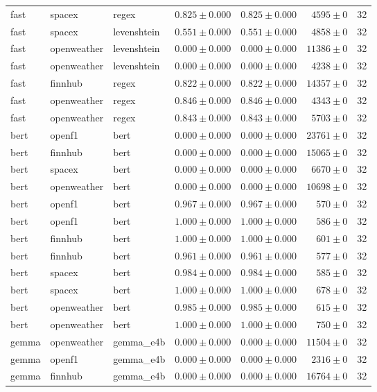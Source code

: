 \begin{table}[htbp]
\begin{tabular}{l l l r r r r}
fast & spacex & regex & $0.825\pm0.000$ & $0.825\pm0.000$ & $4595\pm0$ & 32 \\
fast & spacex & levenshtein & $0.551\pm0.000$ & $0.551\pm0.000$ & $4858\pm0$ & 32 \\
fast & openweather & levenshtein & $0.000\pm0.000$ & $0.000\pm0.000$ & $11386\pm0$ & 32 \\
fast & openweather & levenshtein & $0.000\pm0.000$ & $0.000\pm0.000$ & $4238\pm0$ & 32 \\
fast & finnhub & regex & $0.822\pm0.000$ & $0.822\pm0.000$ & $14357\pm0$ & 32 \\
fast & openweather & regex & $0.846\pm0.000$ & $0.846\pm0.000$ & $4343\pm0$ & 32 \\
fast & openweather & regex & $0.843\pm0.000$ & $0.843\pm0.000$ & $5703\pm0$ & 32 \\
bert & openf1 & bert & $0.000\pm0.000$ & $0.000\pm0.000$ & $23761\pm0$ & 32 \\
bert & finnhub & bert & $0.000\pm0.000$ & $0.000\pm0.000$ & $15065\pm0$ & 32 \\
bert & spacex & bert & $0.000\pm0.000$ & $0.000\pm0.000$ & $6670\pm0$ & 32 \\
bert & openweather & bert & $0.000\pm0.000$ & $0.000\pm0.000$ & $10698\pm0$ & 32 \\
bert & openf1 & bert & $0.967\pm0.000$ & $0.967\pm0.000$ & $570\pm0$ & 32 \\
bert & openf1 & bert & $1.000\pm0.000$ & $1.000\pm0.000$ & $586\pm0$ & 32 \\
bert & finnhub & bert & $1.000\pm0.000$ & $1.000\pm0.000$ & $601\pm0$ & 32 \\
bert & finnhub & bert & $0.961\pm0.000$ & $0.961\pm0.000$ & $577\pm0$ & 32 \\
bert & spacex & bert & $0.984\pm0.000$ & $0.984\pm0.000$ & $585\pm0$ & 32 \\
bert & spacex & bert & $1.000\pm0.000$ & $1.000\pm0.000$ & $678\pm0$ & 32 \\
bert & openweather & bert & $0.985\pm0.000$ & $0.985\pm0.000$ & $615\pm0$ & 32 \\
bert & openweather & bert & $1.000\pm0.000$ & $1.000\pm0.000$ & $750\pm0$ & 32 \\
gemma & openweather & gemma\_e4b & $0.000\pm0.000$ & $0.000\pm0.000$ & $11504\pm0$ & 32 \\
gemma & openf1 & gemma\_e4b & $0.000\pm0.000$ & $0.000\pm0.000$ & $2316\pm0$ & 32 \\
gemma & finnhub & gemma\_e4b & $0.000\pm0.000$ & $0.000\pm0.000$ & $16764\pm0$ & 32 \\

\end{tabular}
\end{table}

